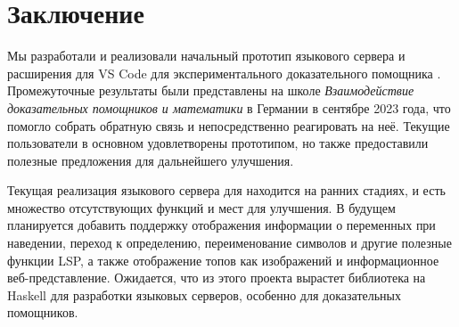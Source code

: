 \chapter{Заключение}
\label{chap:conclusion}

Мы разработали и реализовали начальный прототип языкового сервера и расширения для VS Code для экспериментального доказательного помощника \Rzk{}. Промежуточные результаты были представлены на школе \textit{Взаимодействие доказательных помощников и математики} в Германии в сентябре 2023 года, что помогло собрать обратную связь и непосредственно реагировать на неё. Текущие пользователи в основном удовлетворены прототипом, но также предоставили полезные предложения для дальнейшего улучшения.

Текущая реализация языкового сервера для \Rzk{} находится на ранних стадиях, и есть множество отсутствующих функций и мест для улучшения. В будущем планируется добавить поддержку отображения информации о переменных при наведении, переход к определению, переименование символов и другие полезные функции LSP, а также отображение топов как изображений и информационное веб-представление. Ожидается, что из этого проекта вырастет библиотека на Haskell для разработки языковых серверов, особенно для доказательных помощников.
